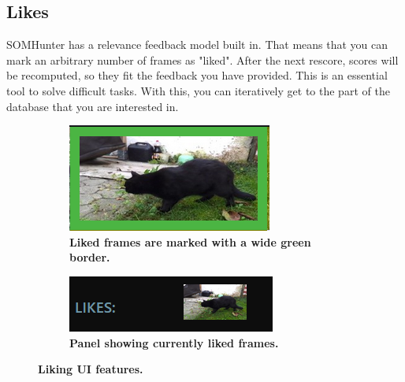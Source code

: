 \subsection{Likes}

SOMHunter has a relevance feedback model built in. That means that you can mark an arbitrary number of frames as "liked". After the next rescore, scores will be recomputed, so they fit the feedback you have provided. This is an essential tool to solve difficult tasks. With this, you can iteratively get to the part of the database that you are interested in.

\begin{figure}[h]
	\centering
  \begin{subfigure}[b]{0.4\textwidth}
      \centering
      \includegraphics[width=\textwidth]{img/liked-frame.png}
      \caption{\textbf{Liked frames are marked with a wide green border.}}
      \label{fig:likes-a}
  \end{subfigure} 
  \hfill
  \begin{subfigure}[b]{0.55\textwidth}
      \centering
      \includegraphics[width=\textwidth]{img/likes-panel.png}
      \caption{\textbf{Panel showing currently liked frames.}}
      \label{fig:likes-b}
  \end{subfigure}
	
  \caption{\textbf{Liking UI features.}}
	
\end{figure}

